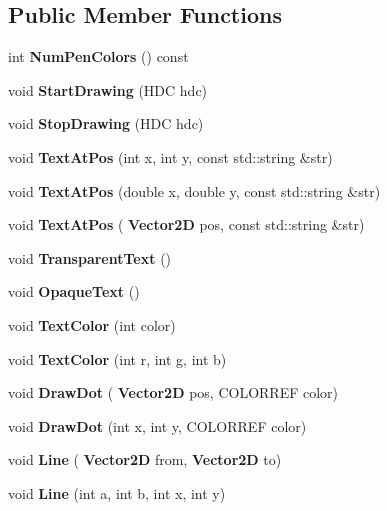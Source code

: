 \subsection*{Public Member Functions}
\begin{DoxyCompactItemize}
\item 
\mbox{\label{classpn_g_f_1_1_cgdi_ab738b8b33de6399326895c1031934043}} 
int {\bfseries Num\+Pen\+Colors} () const
\item 
void \textbf{ Start\+Drawing} (H\+DC hdc)
\item 
void \textbf{ Stop\+Drawing} (H\+DC hdc)
\item 
\mbox{\label{classpn_g_f_1_1_cgdi_a9d1e1650570a89e81d350f22446143f4}} 
void {\bfseries Text\+At\+Pos} (int x, int y, const std\+::string \&str)
\item 
\mbox{\label{classpn_g_f_1_1_cgdi_a2b8d087797daf66e618122dd1fba4d0f}} 
void {\bfseries Text\+At\+Pos} (double x, double y, const std\+::string \&str)
\item 
\mbox{\label{classpn_g_f_1_1_cgdi_a9002a8d9df0c974ca38779188aafcb58}} 
void {\bfseries Text\+At\+Pos} (\textbf{ Vector2D} pos, const std\+::string \&str)
\item 
\mbox{\label{classpn_g_f_1_1_cgdi_a480c0f8d5fb396b8bd1dbdd9024eb5b7}} 
void {\bfseries Transparent\+Text} ()
\item 
\mbox{\label{classpn_g_f_1_1_cgdi_aa6c54457201672b8a73102d868234ee0}} 
void {\bfseries Opaque\+Text} ()
\item 
\mbox{\label{classpn_g_f_1_1_cgdi_a3a616c141ac76ed5fe68f7dd91d40fa9}} 
void {\bfseries Text\+Color} (int color)
\item 
\mbox{\label{classpn_g_f_1_1_cgdi_a8ecb7bc685deed09e6fc760b44be4dc3}} 
void {\bfseries Text\+Color} (int r, int g, int b)
\item 
\mbox{\label{classpn_g_f_1_1_cgdi_a80eefa4e5d571a4add95241e9dcedd4e}} 
void {\bfseries Draw\+Dot} (\textbf{ Vector2D} pos, C\+O\+L\+O\+R\+R\+EF color)
\item 
\mbox{\label{classpn_g_f_1_1_cgdi_a472ed45bf374d0c70188fe33459b97c1}} 
void {\bfseries Draw\+Dot} (int x, int y, C\+O\+L\+O\+R\+R\+EF color)
\item 
\mbox{\label{classpn_g_f_1_1_cgdi_a0570b8d1a06199fc271cab9a2cc3d369}} 
void {\bfseries Line} (\textbf{ Vector2D} from, \textbf{ Vector2D} to)
\item 
\mbox{\label{classpn_g_f_1_1_cgdi_a48b8f9e6717fe2cf7c5112c339a3277c}} 
void {\bfseries Line} (int a, int b, int x, int y)
\item 

\end{DoxyCompactItemize}
